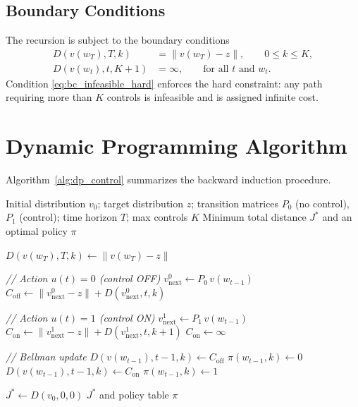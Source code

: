 \documentclass[12pt, a4paper]{report}
\begin{document}
\subsection{Boundary Conditions}
The recursion is subject to the boundary conditions
\begin{align}
	D(v(w_T), T, k) &= \lVert v(w_T) - z \rVert, \qquad 0 \le k \le K, \label{eq:bc_terminal_hard}\\
	D(v(w_t), t, K+1) &= \infty, \qquad \text{for all } t \text{ and } w_t. \label{eq:bc_infeasible_hard}
\end{align}
Condition \eqref{eq:bc_infeasible_hard} enforces the hard constraint: any path requiring more than $K$ controls is infeasible and is assigned infinite cost.

\section{Dynamic Programming Algorithm}
Algorithm~\ref{alg:dp_control} summarizes the backward induction procedure.

\begin{algorithm}[H]
	\caption{DP for Optimal Control with Hard Constraints}
	\label{alg:dp_control}
	\begin{algorithmic}[1]
		\Require Initial distribution $v_0$; target distribution $z$; transition matrices $P_0$ (no control), $P_1$ (control); time horizon $T$; max controls $K$
		\Ensure Minimum total distance $J^*$ and an optimal policy $\pi$
		
		\Statex {}
		\State $D(v(w_T), T, k) \leftarrow \lVert v(w_T) - z \rVert$
		\EndFor
		\EndFor
		
		\Statex {}
		\Statex \quad \textit{// Action $u(t)=0$ (control OFF)}
		\State $v_{\text{next}}^{0} \leftarrow P_0\, v(w_{t-1})$
		\State $C_{\text{off}} \leftarrow \lVert v_{\text{next}}^{0} - z \rVert + D(v_{\text{next}}^{0}, t, k)$
		
		\Statex \quad \textit{// Action $u(t)=1$ (control ON)}
		\State $v_{\text{next}}^{1} \leftarrow P_1\, v(w_{t-1})$
		\State $C_{\text{on}} \leftarrow \lVert v_{\text{next}}^{1} - z \rVert + D(v_{\text{next}}^{1}, t, k+1)$
		\Else
		\State $C_{\text{on}} \leftarrow \infty$
		\EndIf
		
		\Statex \quad \textit{// Bellman update}
		\State $D(v(w_{t-1}), t-1, k) \leftarrow C_{\text{off}}$
		\State $\pi(w_{t-1}, k) \leftarrow 0$
		\Else
		\State $D(v(w_{t-1}), t-1, k) \leftarrow C_{\text{on}}$
		\State $\pi(w_{t-1}, k) \leftarrow 1$
		\EndIf
		\EndFor
		\EndFor
		\EndFor
		
		\Statex {}
		\State $J^* \leftarrow D(v_0, 0, 0)$
		\State \Return $J^*$ and policy table $\pi$
	\end{algorithmic}
\end{algorithm}
\end{document}

